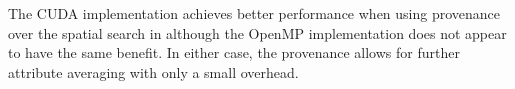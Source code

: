 \documentclass[10pt,journal,cspaper,compsoc]{IEEEtran}
\begin{document}


The CUDA implementation achieves better performance when using provenance
over the spatial search in  although the OpenMP
implementation does not appear to have the same benefit.  In either case,
the provenance allows for further attribute averaging with only a small
overhead.

\end{document}
